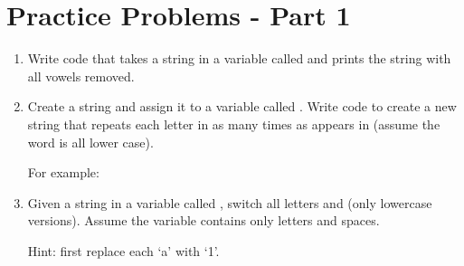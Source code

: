 \documentclass[letterpaper,10pt,english]{sphinxmanual}
\begin{document}
\section{Practice Problems - Part 1}
\label{\detokenize{lecture_notes/lec04_modules_functions1:practice-problems-part-1}}\begin{enumerate}
\def\theenumi{\arabic{enumi}}
\def\labelenumi{\theenumi .}
\makeatletter\def\p@enumii{\p@enumi \theenumi .}\makeatother
\item {} 
Write code that takes a string in a variable called  and
prints the string with all vowels removed.

\item {} 
Create a string and assign it to a variable called
.  Write code to create a new string that repeats each
letter  in  as many times as  appears in 
(assume the word is all lower case).

For example:

\begin{sphinxVerbatim}[commandchars=\\\{\}]
  




\end{sphinxVerbatim}

\item {} 
Given a string in a variable called , switch all letters
 and  (only lowercase versions). Assume the variable
contains only letters and spaces.

Hint: first replace each ‘a’ with ‘1’.

\begin{sphinxVerbatim}[commandchars=\\\{\}]
  



\end{sphinxVerbatim}

\end{enumerate}
\end{document}
